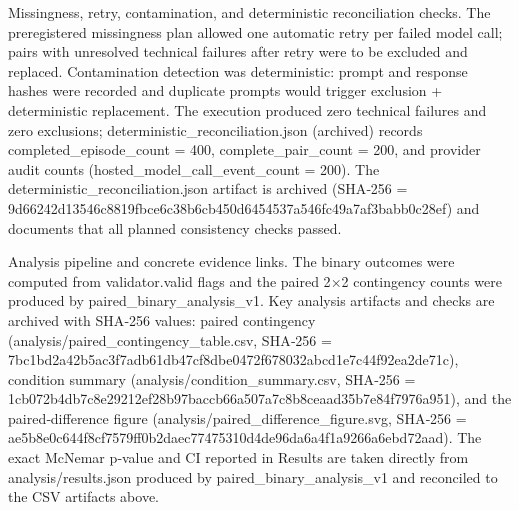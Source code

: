 \documentclass[conference]{IEEEtran}
\begin{document}
Missingness, retry, contamination, and deterministic reconciliation checks. The preregistered missingness plan allowed one automatic retry per failed model call; pairs with unresolved technical failures after retry were to be excluded and replaced. Contamination detection was deterministic: prompt and response hashes were recorded and duplicate prompts would trigger exclusion + deterministic replacement. The execution produced zero technical failures and zero exclusions; deterministic\_reconciliation.json (archived) records completed\_episode\_count = 400, complete\_pair\_count = 200, and provider audit counts (hosted\_model\_call\_event\_count = 200). The deterministic\_reconciliation.json artifact is archived (SHA‑256 = 9d66242d13546c8819fbce6c38b6cb450d6454537a546fc49a7af3babb0c28ef) and documents that all planned consistency checks passed.

Analysis pipeline and concrete evidence links. The binary outcomes were computed from validator.valid flags and the paired 2\ensuremath{\times}2 contingency counts were produced by paired\_binary\_analysis\_v1. Key analysis artifacts and checks are archived with SHA‑256 values: paired contingency (analysis/paired\_contingency\_table.csv, SHA‑256 = 7bc1bd2a42b5ac3f7adb61db47cf8dbe0472f678032abcd1e7c44f92ea2de71c), condition summary (analysis/condition\_summary.csv, SHA‑256 = 1cb072b4db7c8e29212ef28b97baccb66a507a7c8b8ceaad35b7e84f7976a951), and the paired‑difference figure (analysis/paired\_difference\_figure.svg, SHA‑256 = ae5b8e0c644f8cf7579ff0b2daec77475310d4de96da6a4f1a9266a6ebd72aad). The exact McNemar p‑value and CI reported in Results are taken directly from analysis/results.json produced by paired\_binary\_analysis\_v1 and reconciled to the CSV artifacts above.
\end{document}

